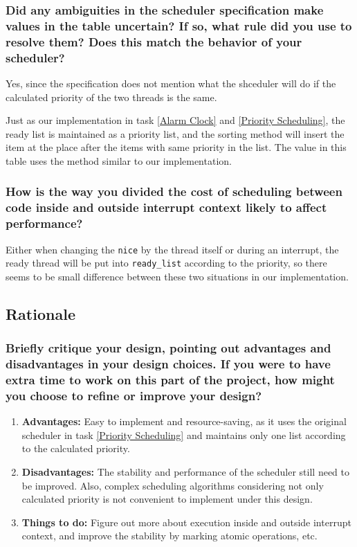 \documentclass[sigconf, nonacm, balance=false, urlbreakonhyphens=true]{acmart}
\begin{document}
            \subsubsection{Did any ambiguities in the scheduler specification make values in the table uncertain? If so, what rule did you use to resolve them? Does this match the behavior of your scheduler? }

            Yes, since the specification does not mention what the shceduler will do if the calculated priority of the two threads is the same. 

            Just as our implementation in task \ref{Alarm Clock} and \ref{Priority Scheduling}, the ready list is maintained as a priority list, and the sorting method will insert the item at the place after the items with same priority in the list. The value in this table uses the method similar to our implementation. 

            \subsubsection{How is the way you divided the cost of scheduling between code inside and outside interrupt context likely to affect performance? }

            Either when changing the \texttt{nice} by the thread itself or during an interrupt, the ready thread will be put into \texttt{ready\_list} according to the priority, so there seems to be small difference between these two situations in our implementation. 

        \subsection{Rationale}

            \subsubsection{Briefly critique your design, pointing out advantages and disadvantages in your design choices. If you were to have extra time to work on this part of the project, how might you choose to refine or improve your design? }

            \begin{enumerate}
                \item \textbf{Advantages:} Easy to implement and resource-saving, as it uses the original scheduler in task \ref{Priority Scheduling} and maintains only one list according to the calculated priority. 
                \item \textbf{Disadvantages:} The stability and performance of the scheduler still need to be improved. Also, complex scheduling algorithms considering not only calculated priority is not convenient to implement under this design. 
                \item \textbf{Things to do:} Figure out more about execution inside and outside interrupt context, and improve the stability by marking atomic operations, etc. 
            \end{enumerate}
\end{document}
